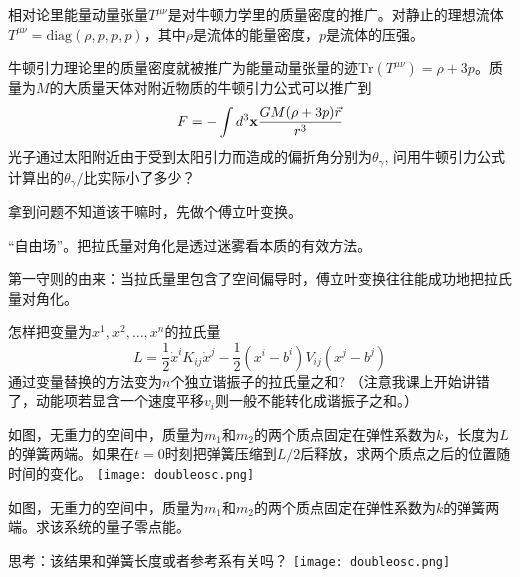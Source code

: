 \documentclass[CJK]{beamer}
\begin{document}
\begin{frame}
\bch
相对论里能量动量张量$T^{\mu\nu}$是对牛顿力学里的质量密度的推广。对静止的理想流体$T^{\mu\nu} = \mathrm{diag}(\rho, p, p, p)$，其中$\rho$是流体的能量密度，$p$是流体的压强。

牛顿引力理论里的质量密度就被推广为能量动量张量的迹$\mathrm{Tr}(T^{\mu\nu}) = \rho + 3p$。质量为$M$的大质量天体对附近物质的牛顿引力公式可以推广到
$$ F = - \int d^3{\mathbf{x}} \frac{GM(\rho + 3p) \vec{r}}{r^3}$$
光子通过太阳附近由于受到太阳引力而造成的偏折角分别为$\theta_\gamma$, 问用牛顿引力公式计算出的$\theta_\gamma/$比实际小了多少？

\ech
\end{frame}

\begin{frame}
\bch
拿到问题不知道该干嘛时，先做个傅立叶变换。
\ech
\end{frame}

\begin{frame}
\bch

{“自由场”。把拉氏量对角化是透过迷雾看本质的有效方法。

\skipline
 第一守则的由来：当拉氏量里包含了空间偏导时，傅立叶变换往往能成功地把拉氏量对角化。}

\ech
\end{frame}

\begin{frame}
\bch
怎样把变量为$x^1, x^2,\ldots, x^n$的拉氏量
$$L = \frac{1}{2} \dot{x}^i K_{ij}\dot{x}^j - \frac{1}{2} (x^i-b^i) V_{ij} (x^j - b^j)$$
通过变量替换的方法变为$n$个独立谐振子的拉氏量之和? （注意我课上开始讲错了，动能项若显含一个速度平移$v_i$则一般不能转化成谐振子之和。）
\ech
\end{frame}


\begin{frame}
\bch
{}
如图，无重力的空间中，质量为$m_1$和$m_2$的两个质点固定在弹性系数为$k$，长度为$L$的弹簧两端。如果在$t=0$时刻把弹簧压缩到$L/2$后释放，求两个质点之后的位置随时间的变化。
\emini
{}
\texttt{[image: doubleosc.png]}
\emini
\ech
\end{frame}


\begin{frame}
\bch
{}
如图，无重力的空间中，质量为$m_1$和$m_2$的两个质点固定在弹性系数为$k$的弹簧两端。求该系统的量子零点能。

\skipline
思考：该结果和弹簧长度或者参考系有关吗？
\emini
{}
\texttt{[image: doubleosc.png]}
\emini
\ech
\end{frame}
\end{document}
